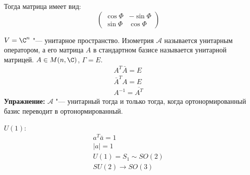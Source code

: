 \begin{exmp}
	Тогда матрица имеет вид:
	\[\begin{pmatrix}
		\cos \Phi & -\sin \Phi \\
		\sin \Phi &  \cos \Phi
	\end{pmatrix}\]
\end{exmp}
\begin{exmp}
	$V = \C^n$ "--- унитарное пространство.
	Изометрия $\mathcal A$ называется  унитарным оператором, а его матрица $A$ в стандартном базисе называется унитарной матрицей.
	$A \in M(n, \C)$, $\Gamma = E$.
	\begin{gather*}
		A^T \bar A  = E \\
		\bar A^T A = E \\
		A^{-1} = \overline{A^T}
	\end{gather*}
	\textbf{Упражнение:} $\mathcal A$ "--- унитарный тогда и только тогда, когда ортонормированный базис переводит в ортонормированный.
\end{exmp}
\begin{exmp}
	$U(1)$:
	\begin{gather*}
		a^T \bar a  = 1 \\
		|a| = 1 \\
		U(1) = S_1 \sim SO(2) \\
		SU(2) \to SO(3)
	\end{gather*}
\end{exmp}
